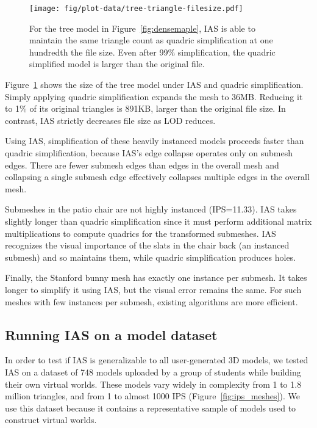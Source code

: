 \begin{figure}
\centering
\texttt{[image: fig/plot-data/tree-triangle-filesize.pdf]}
\caption{For the tree model in Figure~\ref{fig:densemaple}, IAS is able
to maintain the same triangle count as quadric simplification at one hundredth
the file size. Even after 99\% simplification, the quadric simplified model
is larger than the original file.}
\label{fig:size-plots}
\vspace{-8pt}

\end{figure}

Figure~\ref{fig:size-plots} shows the size of the tree model under IAS
and quadric simplification. Simply applying quadric simplification
expands the mesh to 36MB. Reducing it to 1\% of its original triangles
is 891KB, larger than the original file size. In contrast, IAS
strictly decreases file size as LOD reduces.

Using IAS, simplification of these heavily instanced models proceeds
faster than quadric simplification, because IAS's edge
collapse operates only on submesh edges.
There are fewer submesh edges than edges in the overall mesh
and collapsing a single submesh edge effectively collapses multiple
edges in the overall mesh.  

Submeshes in the patio chair are not highly instanced
(IPS=11.33). IAS takes slightly longer than quadric
simplification since it must perform additional matrix multiplications
to compute quadrics for the transformed submeshes. IAS
recognizes the visual importance of the slats in the chair back (an
instanced submesh) and so maintains them, while quadric simplification
produces holes.

Finally, the Stanford bunny mesh has exactly one instance per submesh. 
It takes longer to simplify it using IAS, but the visual
error remains the same. For such meshes with few instances per
submesh, existing algorithms are more
efficient.  

\subsection{Running IAS on a model dataset}
\label{sec:ias_on_database}

In order to test if IAS is generalizable to all user-generated 3D models, we
tested IAS on a dataset of 748 models uploaded by a group of students while
building their own virtual worlds. These models
vary widely in complexity from 1 to 1.8 million triangles, and from 
1 to almost 1000 IPS (Figure~\ref{fig:ips_meshes}). We use this dataset 
because it contains a representative sample of models used to construct virtual
worlds.

